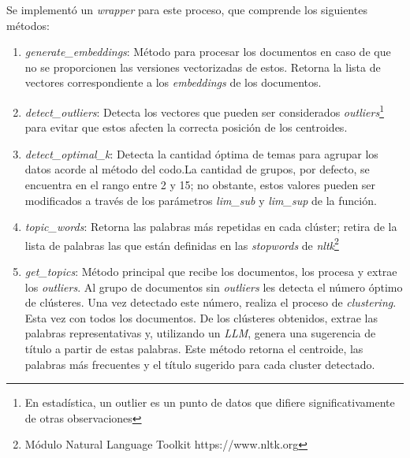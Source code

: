     Se implementó un \emph{wrapper} para este proceso, que comprende los siguientes métodos:
    \begin{enumerate}
        \item \emph{generate\_embeddings}: Método para procesar los documentos en caso de que no se proporcionen las versiones vectorizadas de estos. Retorna la lista de vectores correspondiente a los \emph{embeddings} de los documentos.
        \item \emph{detect\_outliers}: Detecta los vectores que pueden ser considerados \emph{outliers}\footnote{En estadística, un outlier es un punto de datos que difiere significativamente de otras observaciones} para evitar que estos afecten la correcta posición de los centroides.
        \item \emph{detect\_optimal\_k}: Detecta la cantidad óptima de temas para agrupar los datos acorde al método del codo.La cantidad de grupos, por defecto, se encuentra en el rango entre 2 y 15; no obstante, estos valores pueden ser modificados a través de los parámetros \emph{lim\_sub} y \emph{lim\_sup} de la función.
        \item \emph{topic\_words}: Retorna las palabras más repetidas en cada cl\'uster; retira de la lista de palabras las que están definidas en las \emph{stopwords} de \emph{nltk}\footnote{Módulo Natural Language Toolkit https://www.nltk.org}
        \item \emph{get\_topics}: Método principal que recibe los documentos, los procesa y extrae los \emph{outliers}. Al grupo de documentos sin \emph{outliers} les detecta el número óptimo de cl\'usteres. Una vez detectado este número, realiza el proceso de \emph{clustering}. Esta vez con todos los documentos. De los cl\'usteres obtenidos, extrae las palabras representativas y, utilizando un \emph{LLM}, genera una sugerencia de título a partir de estas palabras. Este método retorna el centroide, las palabras más frecuentes y el título sugerido para cada cluster detectado.
    \end{enumerate}

